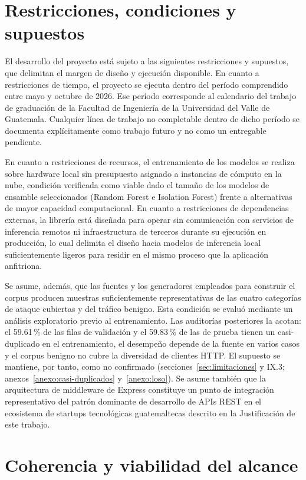 \section{Restricciones, condiciones y supuestos}

El desarrollo del proyecto está sujeto a las siguientes restricciones y supuestos, que delimitan el margen de diseño y ejecución disponible. En cuanto a restricciones de tiempo, el proyecto se ejecuta dentro del período comprendido entre mayo y octubre de 2026. Ese período corresponde al calendario del trabajo de graduación de la Facultad de Ingeniería de la Universidad del Valle de Guatemala. Cualquier línea de trabajo no completable dentro de dicho período se documenta explícitamente como trabajo futuro y no como un entregable pendiente.

En cuanto a restricciones de recursos, el entrenamiento de los modelos se realiza sobre hardware local sin presupuesto asignado a instancias de cómputo en la nube, condición verificada como viable dado el tamaño de los modelos de ensamble seleccionados (Random Forest e Isolation Forest) frente a alternativas de mayor capacidad computacional. En cuanto a restricciones de dependencias externas, la librería está diseñada para operar sin comunicación con servicios de inferencia remotos ni infraestructura de terceros durante su ejecución en producción, lo cual delimita el diseño hacia modelos de inferencia local suficientemente ligeros para residir en el mismo proceso que la aplicación anfitriona.

Se asume, además, que las fuentes y los generadores empleados para construir el corpus producen muestras suficientemente representativas de las cuatro categorías de ataque cubiertas y del tráfico benigno. Esta condición se evaluó mediante un análisis exploratorio previo al entrenamiento. Las auditorías posteriores la acotan: el 59.61\,\% de las filas de validación y el 59.83\,\% de las de prueba tienen un casi-duplicado en el entrenamiento, el desempeño depende de la fuente en varios casos y el corpus benigno no cubre la diversidad de clientes HTTP. El supuesto se mantiene, por tanto, como no confirmado (secciones~\ref{sec:limitaciones} y IX.3; anexos~\ref{anexo:casi-duplicados} y~\ref{anexo:loso}). Se asume también que la arquitectura de middleware de Express constituye un punto de integración representativo del patrón dominante de desarrollo de APIs REST en el ecosistema de startups tecnológicas guatemaltecas descrito en la Justificación de este trabajo.

\section{Coherencia y viabilidad del alcance}

